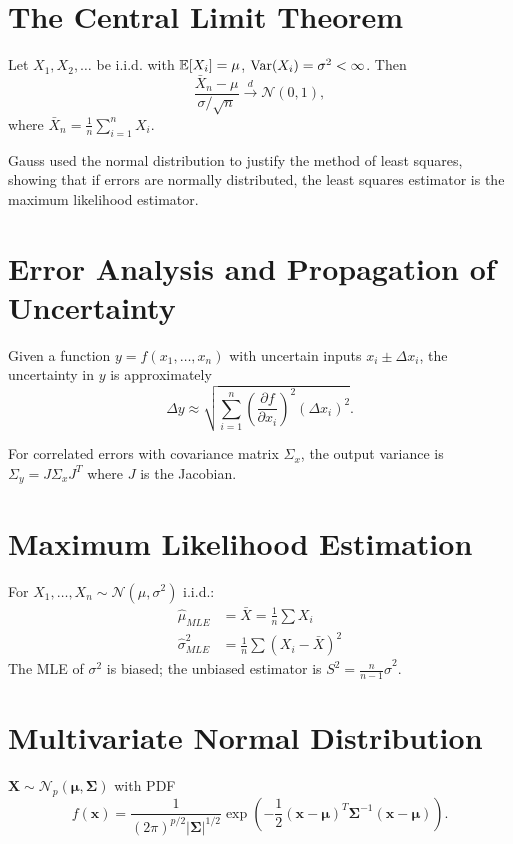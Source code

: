 \section{The Central Limit Theorem}

\begin{theorem}
Let $X_1, X_2, \ldots$ be i.i.d. with $\mathbb{E}[X_i] = \mu$, $\operatorname{Var}(X_i) = \sigma^2 < \infty$. Then
\[
\frac{\bar{X}_n - \mu}{\sigma/\sqrt{n}} \xrightarrow{d} \mathcal{N}(0,1),
\]
where $\bar{X}_n = \frac{1}{n}\sum_{i=1}^n X_i$.
\end{theorem}

Gauss used the normal distribution to justify the method of least squares, showing that if errors are normally distributed, the least squares estimator is the maximum likelihood  estimator.

\section{Error Analysis and Propagation of Uncertainty}

Given a function $y = f(x_1, \ldots, x_n)$ with uncertain inputs $x_i \pm \Delta x_i$, the uncertainty in $y$ is approximately
\[
\Delta y \approx \sqrt{\sum_{i=1}^n \left(\frac{\partial f}{\partial x_i}\right)^2 (\Delta x_i)^2}.
\]

For correlated errors with covariance matrix  $\Sigma_x$, the output variance is $\Sigma_y = J \Sigma_x J^T$ where $J$ is the Jacobian.

\section{Maximum Likelihood Estimation}

For $X_1, \ldots, X_n \sim \mathcal{N}(\mu, \sigma^2)$ i.i.d.:
\begin{align*}
\hat{\mu}_{MLE} &= \bar{X} = \frac{1}{n}\sum X_i \\
\hat{\sigma}^2_{MLE} &= \frac{1}{n}\sum (X_i - \bar{X})^2
\end{align*}
The MLE of $\sigma^2$ is biased; the unbiased estimator is $S^2 = \frac{n}{n-1}\hat{\sigma}^2$.

\section{Multivariate Normal Distribution}

$\mathbf{X} \sim \mathcal{N}_p(\boldsymbol{\mu}, \boldsymbol{\Sigma})$ with PDF
\[
f(\mathbf{x}) = \frac{1}{(2\pi)^{p/2} |\boldsymbol{\Sigma}|^{1/2}} \exp\left(-\frac{1}{2}(\mathbf{x}-\boldsymbol{\mu})^T \boldsymbol{\Sigma}^{-1} (\mathbf{x}-\boldsymbol{\mu})\right).
\]

